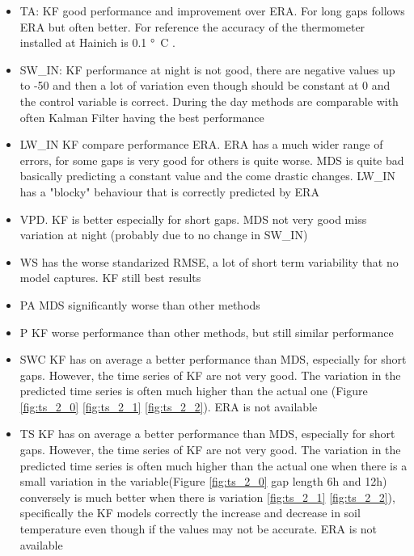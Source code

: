 \documentclass{article}
\begin{document}
\begin{itemize}
    \item TA: KF good performance and improvement over ERA. For long gaps follows ERA but often better. For reference the accuracy of the thermometer installed at Hainich \cite{noauthor_associated_2020} is 0.1 \si{°C} \cite{noauthor_specification_nodate}.
    \item SW\_IN: KF performance at night is not good, there are negative values up to -50 and then a lot of variation even though should be constant at 0 and the control variable is correct. During the day methods are comparable with often Kalman Filter having the best performance 
    \item LW\_IN KF compare performance ERA. ERA has a much wider range of errors, for some gaps is very good for others is quite worse. MDS is quite bad basically predicting a constant value and the come drastic changes. LW\_IN has a "blocky" behaviour that is correctly predicted by ERA
    \item VPD. KF is better especially for short gaps. MDS not very good miss variation at night (probably due to no change in SW\_IN)
    \item WS has the worse standarized RMSE, a lot of short term variability that no model captures. KF still best results 
    \item PA MDS significantly worse than other methods
    \item P KF worse performance than other methods, but still similar performance
    \item SWC KF has on average a better performance than MDS, especially for short gaps. However, the time series of KF are not very good. The variation in the predicted time series is often much higher than the actual one (Figure \ref{fig:ts_2_0} \ref{fig:ts_2_1} \ref{fig:ts_2_2}). ERA is not available
    \item TS KF has on average a better performance than MDS, especially for short gaps. However, the time series of KF are not very good. The variation in the predicted time series is often much higher than the actual one when there is a small variation in the variable(Figure \ref{fig:ts_2_0} gap length 6h and 12h) conversely is much better when there is variation \ref{fig:ts_2_1} \ref{fig:ts_2_2}), specifically the KF models correctly the increase and decrease in soil temperature even though if the values may not be accurate. ERA is not available
    
\end{itemize}
\end{document}
